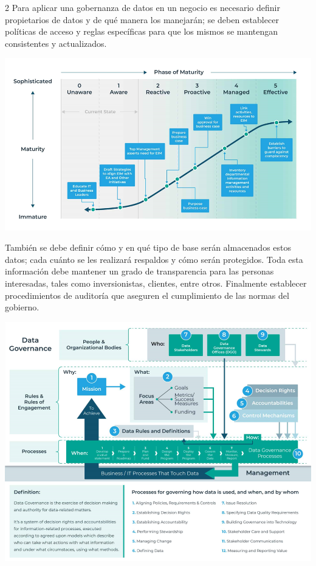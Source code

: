 \documentclass[12pt,spanish,Letterpaper,openany]{book}
\begin{document}
\begin {multicols}{2}
Para aplicar una gobernanza de datos en un negocio es necesario definir propietarios de datos y de qué manera los manejarán; se deben establecer políticas de acceso y reglas específicas para que los mismos se mantengan consistentes y actualizados.

\begin {flushleft}
\noindent\begin{minipage}[c]{\columnwidth}

\begin{center}\includegraphics[width=0.8\linewidth]{images/arzudia_01} \end{center}


\end{minipage}

\end {flushleft}

También se debe definir cómo y en qué tipo de base serán almacenados estos datos; cada cuánto se les realizará respaldos y cómo serán protegidos. Toda esta información debe mantener un grado de transparencia para las personas interesadas, tales como inversionistas, clientes, entre otros. Finalmente establecer procedimientos de auditoría que aseguren el cumplimiento de las normas del gobierno.

\begin {flushleft}
\noindent\begin{minipage}[c]{\columnwidth}

\begin{center}\includegraphics[width=0.8\linewidth]{images/arzudia_02} \end{center}


\end{minipage}
\end{flushleft}
\end{multicols}
\end{document}
